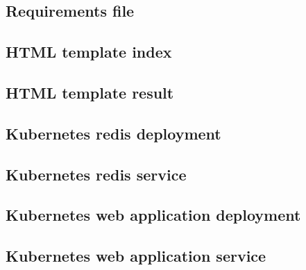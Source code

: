 \subsection{Requirements file}


\subsection{HTML template index}


\subsection{HTML template result}


\subsection{Kubernetes redis deployment}


\subsection{Kubernetes redis service}


\subsection{Kubernetes web application deployment}


\subsection{Kubernetes web application service}


